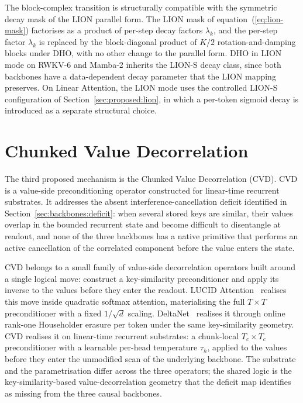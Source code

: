 The block-complex transition is structurally compatible with the
symmetric decay mask of the LION parallel form. The LION mask of
equation~(\ref{eq:lion-mask}) factorises as a product of per-step
decay factors $\lambda_{k}$, and the per-step factor $\lambda_{k}$
is replaced by the block-diagonal product of $K/2$
rotation-and-damping blocks under DHO, with no other change to the
parallel form. DHO in LION mode on RWKV-6 and Mamba-2 inherits
the LION-S decay class, since both backbones have a
data-dependent decay parameter that the LION mapping preserves.
On Linear Attention, the LION mode uses the controlled LION-S
configuration of Section~\ref{sec:proposed:lion}, in which a
per-token sigmoid decay is introduced as a separate structural
choice.

\section{Chunked Value Decorrelation}\label{sec:proposed:cvd}

The third proposed mechanism is the Chunked Value Decorrelation
(CVD). CVD is a value-side preconditioning operator constructed
for linear-time recurrent substrates. It addresses the absent
interference-cancellation deficit identified in
Section~\ref{sec:backbones:deficit}: when several stored keys are
similar, their values overlap in the bounded recurrent state and
become difficult to disentangle at readout, and none of the three
backbones has a native primitive that performs an active
cancellation of the correlated component before the value enters
the state.

CVD belongs to a small family of value-side decorrelation
operators built around a single logical move: construct a
key-similarity preconditioner and apply its inverse to the values
before they enter the readout. LUCID
Attention~\cite{duvvuri2026lucid} realises this move inside
quadratic softmax attention, materialising the full $T \times T$
preconditioner with a fixed $1 / \sqrt{d}$ scaling.
DeltaNet~\cite{schlag2021deltanet, yang2024deltanet} realises it
through online rank-one Householder erasure per token under the
same key-similarity geometry. CVD realises it on linear-time
recurrent substrates: a chunk-local $T_{c} \times T_{c}$
preconditioner with a learnable per-head temperature $\tau_{h}$,
applied to the values before they enter the unmodified scan of
the underlying backbone. The substrate and the parametrisation
differ across the three operators; the shared logic is the
key-similarity-based value-decorrelation geometry that the
deficit map identifies as missing from the three causal
backbones.

